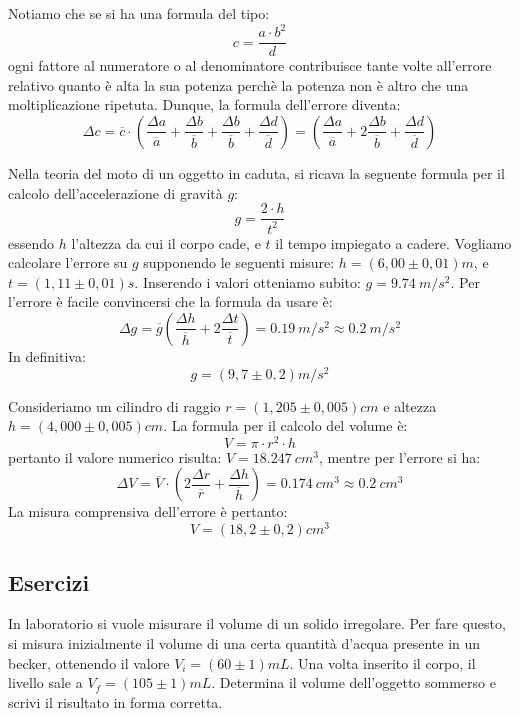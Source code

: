 Notiamo che se si ha una formula del tipo:
\[
c=\frac{a\cdot b^2}{d}
\]
ogni fattore al numeratore o al denominatore contribuisce tante volte all'errore relativo quanto è alta la sua potenza perchè la potenza non è altro che una moltiplicazione ripetuta. Dunque, la formula dell'errore diventa:
\[
\Delta c= \overline{c} \cdot \left(\frac{\Delta a}{\overline{a}}+\frac{\Delta b}{\overline{b}} +\frac{\Delta b}{\overline{b}}  +\frac{\Delta d}{\overline{d}} \right)= \left(\frac{\Delta a}{\overline{a}}+2\frac{\Delta b}{\overline{b}}  +\frac{\Delta d}{\overline{d}} \right)
\]
\begin{testexample}
Nella teoria del moto di un oggetto in caduta, si ricava la seguente formula per il calcolo dell'accelerazione di gravità $g$:
\[
g=\frac{2\cdot h}{t^2}
\]
essendo $h$ l'altezza da cui il corpo cade, e $t$ il tempo impiegato a cadere. Vogliamo calcolare l'errore su $g$ supponendo le seguenti misure: $h=\left(6,00 \pm 0,01\right)\si{m}$, e $t=\left(1,11\pm 0,01\right)\si{s}$. Inserendo i valori otteniamo subito: $g = \SI{9,74}{m/s^2}$.
Per l'errore è facile convincersi che la formula da usare è:
\[
\Delta g= \overline{g}\left(\frac{\Delta h}{\overline{h}} +2\frac{\Delta t}{\overline{t}}\right)=\SI{0,19}{m/s^2}\approx \SI{0,2}{m/s^2}
\]
In definitiva:
\[
g=\left(9,7 \pm 0,2\right)\si{m/s^2}
\]
\end{testexample}
\begin{testexample}
Consideriamo un cilindro di raggio $r=\left(1,205 \pm 0,005\right)\si{cm}$ e altezza $h=\left(4,000 \pm 0,005 \right)\si{cm}$. La formula per il calcolo del volume è:
\[
V=\pi\cdot  r^2 \cdot h
\]
pertanto il valore numerico risulta: $V =\SI{18,247}{cm^3}$, mentre per l'errore si ha:
\[
\Delta V=\overline{V}\cdot \left(2\frac{\Delta r}{\overline{r}} +\frac{\Delta h}{\overline{h}}\right)=\SI{0,174}{cm^3}\approx \SI{0,2}{cm^3}
\]
La misura comprensiva dell'errore è pertanto:
\[
V=\left(18,2 \pm 0,2\right)\si{cm^3}
\]
\end{testexample}


\subsection{Esercizi}
\begin{esercizio}
In laboratorio si vuole misurare il volume di un solido irregolare. Per fare questo, si misura inizialmente il volume di una certa quantità d'acqua presente in un becker, ottenendo il valore  $V_i=\left(60 \pm 1\right)\si{mL}$. Una volta inserito il corpo, il livello sale a $V_f=\left(105 \pm 1\right)\si{mL}$. Determina il volume dell'oggetto sommerso e scrivi il risultato in forma corretta.\\
\end{esercizio}

